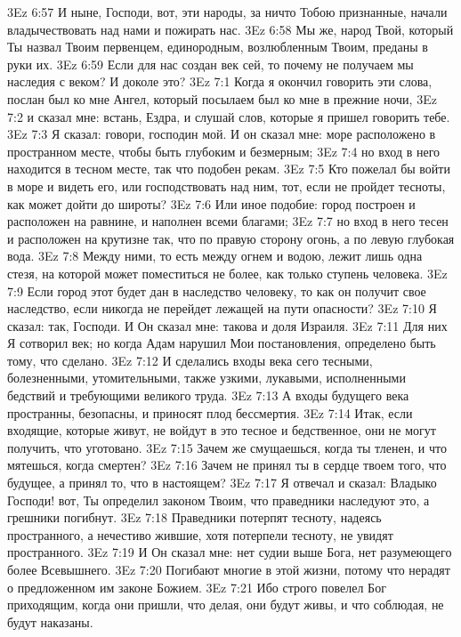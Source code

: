 \vs 3Ez 6:57 И ныне, Господи, вот, эти народы, за ничто Тобою признанные, начали владычествовать над нами и пожирать нас.
\vs 3Ez 6:58 Мы же, народ Твой, который Ты назвал Твоим первенцем, единородным, возлюбленным Твоим, преданы в руки их.
\vs 3Ez 6:59 Если для нас создан век сей, то почему не получаем мы наследия с веком? И доколе это?
\vs 3Ez 7:1 Когда я окончил говорить эти слова, послан был ко мне Ангел, который посылаем был ко мне в прежние ночи,
\vs 3Ez 7:2 и сказал мне: встань, Ездра, и слушай слов, которые я пришел говорить тебе.
\vs 3Ez 7:3 Я сказал: говори, господин мой. И он сказал мне: море расположено в пространном месте, чтобы быть глубоким и безмерным;
\vs 3Ez 7:4 но вход в него находится в тесном месте, так что подобен рекам.
\vs 3Ez 7:5 Кто пожелал бы войти в море и видеть его, или господствовать над ним, тот, если не пройдет тесноты, как может дойти до широты?
\vs 3Ez 7:6 Или иное подобие: город построен и расположен на равнине, и наполнен всеми благами;
\vs 3Ez 7:7 но вход в него тесен и расположен на крутизне так, что по правую сторону огонь, а по левую глубокая вода.
\vs 3Ez 7:8 Между ними, то есть между огнем и водою, лежит лишь одна стезя, на которой может поместиться не более, как только ступень человека.
\vs 3Ez 7:9 Если город этот будет дан в наследство человеку, то как он получит свое наследство, если никогда не перейдет лежащей на пути опасности?
\vs 3Ez 7:10 Я сказал: так, Господи. И Он сказал мне: такова и доля Израиля.
\vs 3Ez 7:11 Для них Я сотворил век; но когда Адам нарушил Мои постановления, определено быть тому, что сделано.
\vs 3Ez 7:12 И сделались входы века сего тесными, болезненными, утомительными, также узкими, лукавыми, исполненными бедствий и требующими великого труда.
\vs 3Ez 7:13 А входы будущего века пространны, безопасны, и приносят плод бессмертия.
\vs 3Ez 7:14 Итак, если входящие, которые живут, не войдут в это тесное и бедственное, они не могут получить, что уготовано.
\vs 3Ez 7:15 Зачем же смущаешься, когда ты тленен, и что мятешься, когда смертен?
\vs 3Ez 7:16 Зачем не принял ты в сердце твоем того, что будущее, а принял то, что в настоящем?
\vs 3Ez 7:17 Я отвечал и сказал: Владыко Господи! вот, Ты определил законом Твоим, что праведники наследуют это, а грешники погибнут.
\vs 3Ez 7:18 Праведники потерпят тесноту, надеясь пространного, а нечестиво жившие, хотя потерпели тесноту, не увидят пространного.
\vs 3Ez 7:19 И Он сказал мне: нет судии выше Бога, нет разумеющего более Всевышнего.
\vs 3Ez 7:20 Погибают многие в этой жизни, потому что нерадят о предложенном им законе Божием.
\vs 3Ez 7:21 Ибо строго повелел Бог приходящим, когда они пришли, что делая, они будут живы, и что соблюдая, не будут наказаны.
